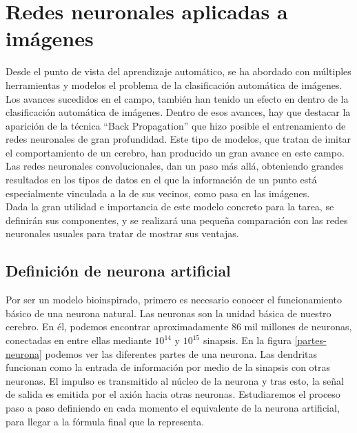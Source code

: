 \section{Redes neuronales aplicadas a imágenes}
Desde el punto de vista del aprendizaje automático, se ha abordado con múltiples herramientas y modelos el problema de la clasificación automática de imágenes. Los avances sucedidos en el campo, también han tenido un efecto en dentro de la clasificación automática de imágenes. Dentro de esos avances, hay que destacar la aparición de la técnica ``Back Propagation'' que hizo posible el entrenamiento de redes neuronales de gran profundidad. Este tipo de modelos, que tratan de imitar el comportamiento de un cerebro, han producido un gran avance en este campo.\\

Las redes neuronales convolucionales, dan un paso más allá, obteniendo grandes resultados en los tipos de datos en el que la información de un punto está especialmente vinculada a la de sus vecinos, como pasa en las imágenes.\\
 
Dada la gran utilidad e importancia de este modelo concreto para la tarea, se definirán sus componentes, y se realizará una pequeña comparación con las redes neuronales usuales para tratar de mostrar sus ventajas.\\

\subsection{Definición de neurona artificial}

Por ser un modelo bioinspirado, primero es necesario conocer el funcionamiento básico de una neurona natural. Las neuronas son la unidad básica de nuestro cerebro. En él, podemos encontrar aproximadamente 86 mil millones de neuronas, conectadas en entre ellas mediante $10^{14}$ y $10^{15}$ sinapsis. En la figura \ref{partes-neurona} podemos ver las diferentes partes de una neurona. Las dendritas funcionan como la entrada de información por medio de la sinapsis con otras neuronas. El impulso es transmitido al núcleo de la neurona y tras esto, la señal de salida es emitida por el axión hacia otras neuronas. Estudiaremos el proceso paso a paso definiendo en cada momento el equivalente de la neurona artificial, para llegar a la fórmula final que la representa.\\

